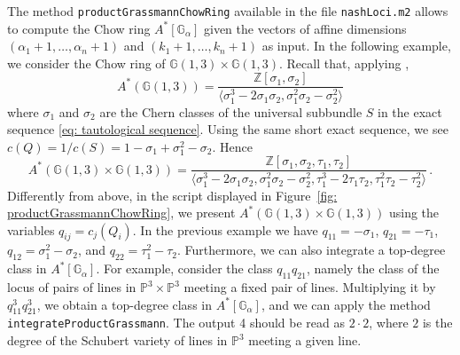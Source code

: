 \documentclass[12pt]{article}
\theoremstyle{definition}
\newenvironment{example}
{\pushQED{\qed}\renewcommand{\qedsymbol}{$\diamond$}\examplex}
{\popQED\endexamplex}
\newcommand{\G}{{\mathbb G}}
\newcommand{\Z}{{\mathbb Z}}
\newcommand{\PP}{{\mathbb P}}
\begin{document}
\begin{example}
\label{ex: Chow grass lines P3}
The method {\tt productGrassmannChowRing} available in the file {\tt nashLoci.m2} allows to compute the Chow ring $A^*[\G_\alpha]$ given the vectors of affine dimensions $(\alpha_1+1,\ldots,\alpha_n+1)$ and $(k_1+1,\ldots,k_n+1)$ as input. In the following example, we consider the Chow ring of $\G(1,3)\times\G(1,3)$. Recall that, applying \cite[Theorem 5.26]{EH},
\[
    A^*(\G(1,3)) = \frac{\Z[\sigma_1,\sigma_2]}{\langle\sigma_1^3-2\sigma_1\sigma_2,\sigma_1^2\sigma_2-\sigma_2^2\rangle}
\]
where $\sigma_1$ and $\sigma_2$ are the Chern classes of the universal subbundle $S$ in the exact sequence \eqref{eq: tautological sequence}. Using the same short exact sequence, we see $c(Q)=1/c(S)=1-\sigma_1+\sigma_1^2-\sigma_2$. Hence
\begin{equation}\label{eq: chowring rep for 2G(1,3)}
    A^*(\G(1,3)\times \G(1,3)) = \frac{\Z[\sigma_1,\sigma_2,\tau_1,\tau_2]}{\langle\sigma_1^3-2\sigma_1\sigma_2,\sigma_1^2\sigma_2-\sigma_2^2,\tau_1^3-2\tau_1\tau_2,\tau_1^2\tau_2-\tau_2^2\rangle}\,.
\end{equation}
Differently from above, in the script displayed in Figure~\ref{fig: productGrassmannChowRing}, we present $A^*(\G(1,3)\times \G(1,3))$ using the variables $q_{ij}=c_j(Q_i)$. In the previous example we have $q_{11}=-\sigma_1$, $q_{21}=-\tau_1$, $q_{12}=\sigma_1^2-\sigma_2$, and $q_{22}=\tau_1^2-\tau_2$. Furthermore, we can also integrate a top-degree class in $A^*[\G_\alpha]$. For example, consider the class $q_{11}q_{21}$, namely the class of the locus of pairs of lines in $\PP^3\times\PP^3$ meeting a fixed pair of lines. Multiplying it by $q_{11}^3q_{21}^3$, we obtain a top-degree class in $A^*[\G_\alpha]$, and we can apply the method {\tt integrateProductGrassmann}. The output 4 should be read as $2\cdot 2$, where $2$ is the degree of the Schubert variety of lines in $\PP^3$ meeting a given line.
\end{example}
\end{document}
